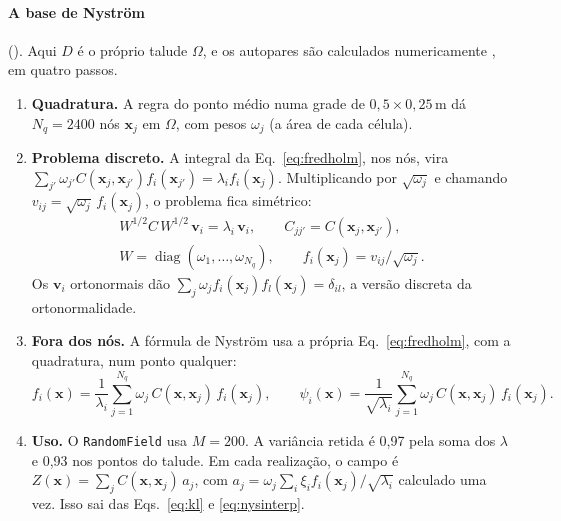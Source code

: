 \documentclass[11pt,a4paper]{article}
\begin{document}
\paragraph{A base de Nyström} (). Aqui $D$ é o próprio talude $\Omega$, e os
autopares são calculados numericamente \citep{betz2014}, em quatro passos.
\begin{enumerate}
  \item \textbf{Quadratura.} A regra do ponto médio numa grade de $0{,}5\times0{,}25$\,m dá $N_q = 2400$ nós
    $\bm x_j$ em $\Omega$, com pesos $\omega_j$ (a área de cada célula).
  \item \textbf{Problema discreto.} A integral da Eq.~\eqref{eq:fredholm}, nos nós, vira
    $\sum_{j'}\omega_{j'}C(\bm x_j, \bm x_{j'})f_i(\bm x_{j'}) = \lambda_i f_i(\bm x_j)$. Multiplicando por
    $\sqrt{\omega_j}$ e chamando $v_{ij} = \sqrt{\omega_j}\,f_i(\bm x_j)$, o problema fica simétrico:
    \begin{equation}
      \begin{gathered}
      W^{1/2} C\, W^{1/2}\,\bm v_i = \lambda_i\,\bm v_i, \qquad C_{jj'} = C(\bm x_j, \bm x_{j'}),\\
      W = \operatorname{diag}(\omega_1, \dots, \omega_{N_q}), \qquad f_i(\bm x_j) = v_{ij}/\sqrt{\omega_j}.
      \end{gathered}
      \label{eq:nysdisc}
    \end{equation}
    Os $\bm v_i$ ortonormais dão $\sum_j\omega_j f_i(\bm x_j)f_l(\bm x_j) = \delta_{il}$, a versão discreta da
    ortonormalidade.
  \item \textbf{Fora dos nós.} A fórmula de Nyström usa a própria Eq.~\eqref{eq:fredholm}, com a quadratura, num
    ponto qualquer:
    \begin{equation}
      f_i(\bm x) = \frac{1}{\lambda_i}\sum_{j=1}^{N_q}\omega_j\,C(\bm x, \bm x_j)\,f_i(\bm x_j), \qquad
      \psi_i(\bm x) = \frac{1}{\sqrt{\lambda_i}}\sum_{j=1}^{N_q}\omega_j\,C(\bm x, \bm x_j)\,f_i(\bm x_j).
      \label{eq:nysinterp}
    \end{equation}
  \item \textbf{Uso.} O \texttt{RandomField} usa $M = 200$. A variância retida é 0,97 pela soma dos $\lambda$ e 0,93
    nos pontos do talude. Em cada realização, o campo é $Z(\bm x) = \sum_j C(\bm x, \bm x_j)\,a_j$, com
    $a_j = \omega_j\sum_i \xi_i f_i(\bm x_j)/\sqrt{\lambda_i}$ calculado uma vez. Isso sai das Eqs.~\eqref{eq:kl} e
    \eqref{eq:nysinterp}.
\end{enumerate}
\end{document}
